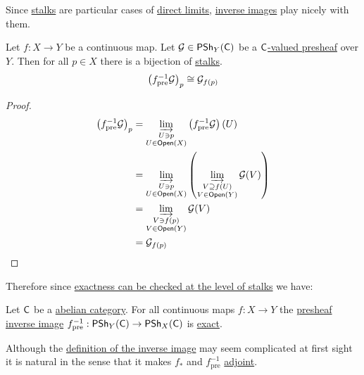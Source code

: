 \documentclass[../../main]{subfiles}
\begin{document}
Since \hyperref[def:stalk]{stalks} are particular cases of \hyperref[def:direct-limit]{direct limits}, \hyperref[def:inverse-image-presheaf]{inverse images} play nicely with them.
\begin{lemma}\label{lemma:stalk-inverse-image-presheaf}
  Let \(f\colon X \to Y\) be a continuous map.
  Let \(\mathcal{G} \in \mathsf{PSh}_{Y}(\mathsf{C})\) be a \hyperref[def:presheaf]{\(\mathsf{C}\)-valued presheaf} over \(Y\).
  Then for all \(p \in X\) there is a bijection of \hyperref[def:stalk]{stalks}.
  \begin{equation*}
    \left( f_{\operatorname*{pre}}^{-1}\mathcal{G} \right)_{p} \cong \mathcal{G}_{f(p)}
  \end{equation*}
\end{lemma}
\begin{proof}
  \begin{align*}
    \left( f_{\operatorname*{pre}}^{-1}\mathcal{G} \right)_{p} &= \varinjlim_{\substack{U \ni p \\ U \in \mathsf{Open}(X)}}  \left( f_{\operatorname*{pre}}^{-1}\mathcal{G} \right)(U) \\
                                      &= \varinjlim_{\substack{U \ni p \\ U \in \mathsf{Open}(X)}} \left( \varinjlim_{\substack{V \supseteq f(U) \\ V \in \mathsf{Open}(Y)}} \mathcal{G}(V) \right) \\
                                      &= \varinjlim_{\substack{V \ni f(p) \\ V \in \mathsf{Open}(Y)}} \mathcal{G}(V) \\
                                      &= \mathcal{G}_{f(p)} \qedhere
  \end{align*}
\end{proof}

Therefore since \hyperref[cor:exactness-at-stalks]{exactness can be checked at the level of stalks} we have:
\begin{corollary}
  Let \(\mathsf{C}\) be a \hyperref[def:abelian-category]{abelian category}.
  For all continuous maps \(f\colon X \to Y\) the \hyperref[def:inverse-image-presheaf]{presheaf inverse image} \(f_{\operatorname*{pre}}^{-1}: \mathsf{PSh}_{Y}(\mathsf{C}) \to \mathsf{PSh}_{X}(\mathsf{C})\) is \hyperref[def:exact-functor]{exact}.
\end{corollary}

Although the \hyperref[def:inverse-image-presheaf]{definition of the inverse image} may seem complicated at first sight it is natural in the sense that it makes \(f_{\ast}\) and \(f_{\operatorname{pre}}^{-1}\) \hyperref[def:adjoint-functors]{adjoint}.
\end{document}

